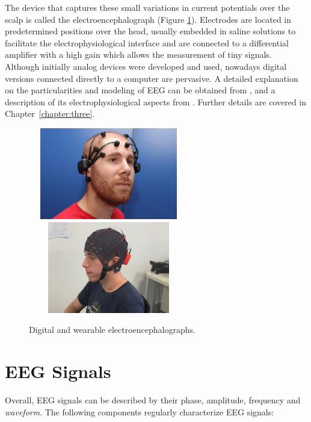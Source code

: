 
The device that captures these small variations in current potentials over the scalp is called the electroencephalograph (Figure \ref{fig:digitalelectroencephalograph}).  Electrodes are located in predetermined positions over the head, usually embedded in saline solutions to facilitate the electrophysiological interface and are connected to a differential amplifier with a high gain which allows the measurement of tiny signals. Although initially analog devices were developed and used, nowadays digital versions connected directly to a computer are pervasive.  A detailed explanation on the particularities and modeling of EEG can be obtained from \cite{Jackson2014}, and a description of its electrophysiological aspects from \cite{Haberman2012}.  Further details are covered in Chapter~\ref{chapter:three}. 

\begin{figure}[]
\centering
\includegraphics[height=4cm,width=7cm]{images/emotivsubject.jpg}
\includegraphics[height=4cm,width=7cm]{images/gTecsubject.jpg}
\caption[Wearable portable Digital Electroencephalograph]{Digital and wearable electroencephalographs.}
\label{fig:digitalelectroencephalograph}
\end{figure}

\section{EEG Signals}

Overall, EEG signals can be described by their phase, amplitude,  frequency and \textit{waveform}.  The following components regularly  characterize EEG signals:

